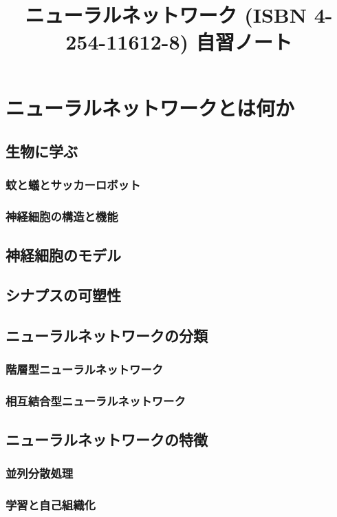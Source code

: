 \documentclass[uplatex, 11pt, a4j, dvipdfmx]{jsarticle}
\title{ニューラルネットワーク (ISBN 4-254-11612-8) 自習ノート}
\author{}
\date{}
\begin{document}
  \maketitle

  \tableofcontents

  \section{ニューラルネットワークとは何か}
    \subsection{生物に学ぶ}
      \subsubsection{蚊と蟻とサッカーロボット}
      \subsubsection{神経細胞の構造と機能}
    \subsection{神経細胞のモデル}
    \subsection{シナプスの可塑性}
    \subsection{ニューラルネットワークの分類}
      \subsubsection{階層型ニューラルネットワーク}
      \subsubsection{相互結合型ニューラルネットワーク}
    \subsection{ニューラルネットワークの特徴}
      \subsubsection{並列分散処理}
      \subsubsection{学習と自己組織化}
\end{document}
